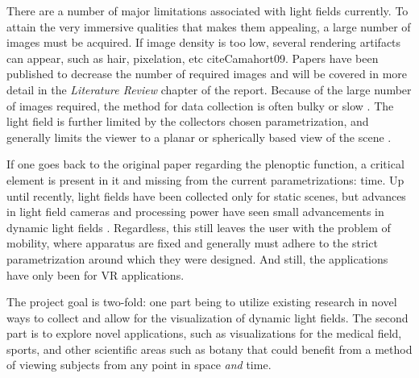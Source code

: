 \documentclass[12pt]{report}
\begin{document}
There are a number of major limitations associated with light fields currently. To attain the very immersive qualities that makes them appealing, a large number of images must be acquired. If image density is too low, several rendering artifacts can appear, such as hair, pixelation, etc cite{Camahort09}. Papers have been published to decrease the number of required images and will be covered in more detail in the \emph{Literature Review} chapter of the report. Because of the large number of images required, the method for data collection is often bulky or slow \cite{lfArchive}. The light field is further limited by the collectors chosen parametrization, and generally limits the viewer to a planar or spherically based view of the scene \cite{Levoy06a}. 

If one goes back to the original paper regarding the plenoptic function, a critical element is present in it and missing from the current parametrizations: time. Up until recently, light fields have been collected only for static scenes, but advances in light field cameras and processing power have seen small advancements in dynamic light fields \cite{Anderson16, lytro}. Regardless, this still leaves the user with the problem of mobility, where apparatus are fixed and generally must adhere to the strict parametrization around which they were designed. And still, the applications have only been for VR applications.

The project goal is two-fold: one part being to utilize existing research in novel ways to collect and allow for the visualization of dynamic light fields. The second part is to explore novel applications, such as visualizations for the medical field, sports, and other scientific areas such as botany that could benefit from a method of viewing subjects from any point in space \emph{and} time.
\end{document}
